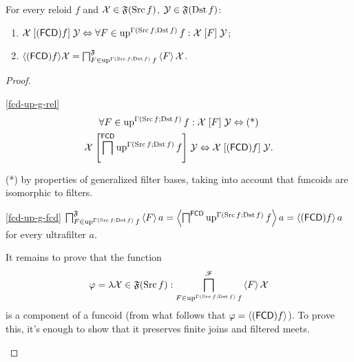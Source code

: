 \begin{thm}
For every reloid $f$ and $\mathcal{X}\in\mathfrak{F}(\operatorname{Src} f)$, $\mathcal{Y}\in\mathfrak{F}(\operatorname{Dst} f)$:
\begin{enumerate}
\item \label{fcd-up-g-rel}$\mathcal{X}\mathrel{[(\mathsf{FCD}) f]}\mathcal{Y}\Leftrightarrow\forall F\in\operatorname{up}^{\Gamma(\operatorname{Src} f;\operatorname{Dst} f)}f:\mathcal{X}\mathrel{\left[F\right]}\mathcal{Y}$;
\item \label{fcd-up-g-fcd}$\langle(\mathsf{FCD}) f\rangle\mathcal{X}=\bigsqcap_{F\in\operatorname{up}^{\Gamma(\operatorname{Src} f;\operatorname{Dst} f)}f}^{\mathfrak{F}}\left\langle F\right\rangle\mathcal{X}$.
\end{enumerate}
\end{thm}
\begin{proof}
~
\begin{widedisorder}
\item [{\ref{fcd-up-g-rel}}] ~
\begin{multline*}
\forall F\in\operatorname{up}^{\Gamma(\operatorname{Src} f;\operatorname{Dst} f)}f:\mathcal{X}\mathrel{\left[F\right]}\mathcal{Y}\Leftrightarrow\text{(*)}\\
\mathcal{X}\mathrel{\left[\bigsqcap^{\mathsf{FCD}}\operatorname{up}^{\Gamma(\operatorname{Src} f;\operatorname{Dst} f)}f\right]}\mathcal{Y}\Leftrightarrow\mathcal{X}\mathrel{\left[(\mathsf{FCD}) f\right]}\mathcal{Y}.
\end{multline*}



({*}) by properties of generalized filter bases, taking into account
that funcoids are isomorphic to filters.

\item [{\ref{fcd-up-g-fcd}}] $\bigsqcap_{F\in\operatorname{up}^{\Gamma(\operatorname{Src} f;\operatorname{Dst} f)}f}^{\mathfrak{F}}\left\langle F\right\rangle a=\left\langle \bigsqcap^{\mathsf{FCD}}\operatorname{up}^{\Gamma(\operatorname{Src} f;\operatorname{Dst} f)}f\right\rangle a=\left\langle (\mathsf{FCD}) f\right\rangle a$
for every ultrafilter $a$.


It remains to prove that the function 
\[
\varphi=\lambda\mathcal{X}\in\mathfrak{F}(\operatorname{Src} f):\bigsqcap_{F\in\operatorname{up}^{\Gamma(\operatorname{Src} f;\operatorname{Dst} f)}f}^{\mathscr{F}}\left\langle F\right\rangle\mathcal{X}
\]
is a component of a funcoid (from what follows that $\varphi=\left\langle (\mathsf{FCD}) f\right\rangle$).
To prove this, it's enough to show that it preserves finite joins
and filtered meets.



\end{widedisorder}
\end{proof}
